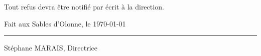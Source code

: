 \documentclass[11pt,a4paper]{article}
\begin{document}
   Tout refus devra être notifié par écrit à la direction.


   \vspace{4cm}

   Fait aux Sables d'Olonne, le \today

   \vspace{2cm}

   \begin{flushright}
      \rule{6cm}{0.5pt}

      {Stéphane MARAIS, Directrice \kern 9pt}

   \end{flushright}
\end{document}
